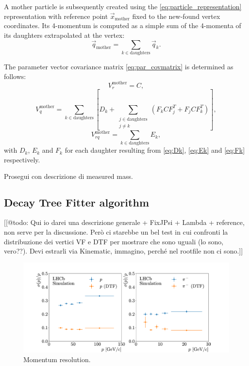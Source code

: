 A mother particle is subsequently created using the \eqref{eq:particle_representation} representation with reference point $\vec{x}_\text{mother}$ fixed to the new-found vertex coordinates.
Its 4-momentum is computed as a simple sum of the 4-momenta of its daughters extrapolated at the vertex:
\begin{equation}
	\vec{q}_\text{mother} = \sum_{k \in \text{daughters}} \vec{q}_k.
\end{equation}

The parameter vector covariance matrix \eqref{eq:par_covmatrix} is determined as follows:
\begin{equation}
	V_{r}^\text{mother} = C,
\end{equation}
\begin{equation}
	V_{q}^\text{mother} = \sum_{k \in \text{daughters}} \left[
		D_k
		+
		\sum_{\substack{j\in\text{daughters} \\ j \neq k}}
		\left(
			F_k C F_j^T + F_j C F_k^T
		\right)
	\right],
\end{equation}
\begin{equation}
	V_{rq}^\text{mother} = \sum_{k \in \text{daughters}} E_k,
\end{equation}
with $D_k$, $E_k$ and $F_k$ for each daughter resulting from \eqref{eq:Dk}, \eqref{eq:Ek} and \eqref{eq:Fk} respectively.

Prosegui con descrizione di measured mass.

\subsection{Decay Tree Fitter algorithm}
[[@todo: Qui io darei una descrizione generale + FixJPsi + Lambda + reference, non serve per la discussione. Però ci starebbe un bel test in cui confronti la distribuzione dei vertici VF e DTF per mostrare che sono uguali (lo sono, vero??). Devi estrarli via Kinematic, immagino, perché nel rootfile non ci sono.]]

\begin{figure}[t]
	\centering
	\includegraphics[width=\textwidth]{graphics/04-event_selection/paper_momentum_resolutions.pdf}
	\caption[Momentum resolution.]{Momentum resolution.}
\end{figure}

